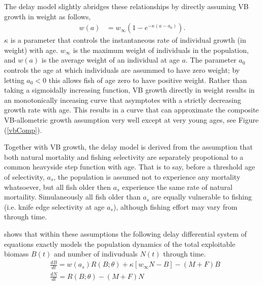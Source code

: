 %
The delay model slightly abridges these relationships by directly assuming VB
growth in weight as follows,
%
\begin{align}
w(a) &= w_\infty(1-e^{-\kappa (a-a_0)}). \label{vbGrowth}
\end{align}
%
$\kappa$ is a parameter that controls the instantaneous rate of individual
growth (in weight) with age. $w_\infty$ is the maximum weight of individuals
in the population, and $w(a)$ is the average weight of an individual at
age $a$. The parameter $a_0$ controls the age at which individuals are assummed
to have zero weight; by letting $a_0<0$ this allows fish of age zero to have
positive weight. Rather than taking a sigmoidally increasing function, VB growth
directly in weight results in an monotonically inceasing curve that asymptotes
with a strictly decreasing growth rate with age. This results in a curve that
can approximate the composite VB-allometric growth assumption very well except 
at very young ages, see Figure (\ref{vbComp}).

%
Together with VB growth, the delay model is derived from the assumption that
both natural mortality and fishing selectivity are separately propotional
to a common heavyside step function with age. That is to say, before a threshold
age of selectivity, $a_s$, the population is assumed not to experience any
mortality whatsoever, but all fish older then $a_s$ experience the same rate
of natural mortaility. Simulaneously all fish older than $a_s$ are equally
vulnerable to fishing (i.e. knife edge selectivity at age $a_s$), although
fishing effort may vary from through time.

%
\cite{walters_continuous_2020} shows that within these assumptions the
following delay differential system of equations exactly models the population
dynamics of the total exploitable biomass $B(t)$ and number of indivuduals $N(t)$
through time.
%
\begin{align}%
&\frac{dB}{dt} = w(a_s)R(B;\theta) + \kappa \left[w_\infty N-B\right] - (M+F)B \label{bEq}\\
&\frac{dN}{dt} = R(B;\theta) - (M+F)N \label{nEq}
\end{align}


